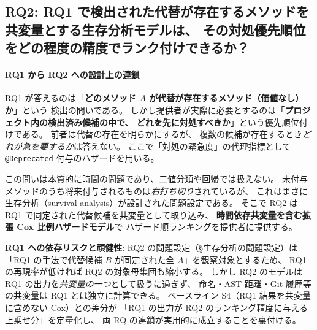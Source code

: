 \documentclass[a4paper,12pt]{article}
\begin{document}
\subsection{RQ2: RQ1 で検出された代替が存在するメソッドを共変量とする生存分析モデルは、
その対処優先順位をどの程度の精度でランク付けできるか？}

\paragraph{RQ1 から RQ2 への設計上の連鎖}

RQ1 が答えるのは「\textbf{どのメソッド $A$ が代替が存在するメソッド（価値なし）か}」という
検出の問いである。
しかし提供者が実際に必要とするのは「\textbf{プロジェクト内の検出済み候補の中で、
どれを先に対処すべきか}」という優先順位付けである。
前者は代替の存在を明らかにするが、
複数の候補が存在するとき\emph{どれが急を要するか}は答えない。
ここで「対処の緊急度」の代理指標として \texttt{@Deprecated} 付与のハザードを用いる。

この問いは本質的に時間の問題であり、二値分類や回帰では扱えない。
未付与メソッドのうち将来付与されるものは\emph{右打ち切り}されているが、
これはまさに生存分析（survival analysis）が設計された問題設定である。
そこで RQ2 は RQ1 で同定された代替候補を共変量として取り込み、
\textbf{時間依存共変量を含む拡張 Cox 比例ハザードモデル}で
ハザード順ランキングを提供者に提供する。

\textbf{RQ1 への依存リスクと頑健性}:
RQ2 の問題設定（§生存分析の問題設定）は
「RQ1 の手法で代替候補 $B$ が同定された全 $A$」を観察対象とするため、
RQ1 の再現率が低ければ RQ2 の対象母集団も縮小する。
しかし RQ2 のモデルは RQ1 の出力を\emph{共変量の一つ}として扱うに過ぎず、
命名・AST 距離・Git 履歴等の共変量は RQ1 とは独立に計算できる。
ベースライン S4（RQ1 結果を共変量に含めない Cox）との差分が
「RQ1 の出力が RQ2 のランキング精度に与える上乗せ分」を定量化し、
両 RQ の連鎖が実用的に成立することを裏付ける。
\end{document}
